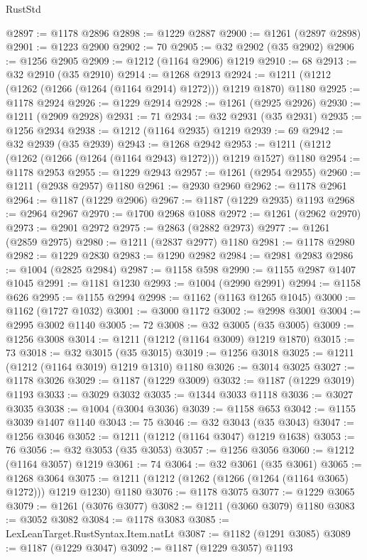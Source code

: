 \begin{lexlean}{RustStd}
\begin{coremodule}
@2897 := @1178 @2896
@2898 := @1229 @2887
@2900 := @1261 (@2897 @2898)
@2901 := @1223 @2900
@2902 := 70
@2905 := @32 @2902 (@35 @2902)
@2906 := @1256 @2905
@2909 := @1212 (@1164 @2906) @1219
@2910 := 68
@2913 := @32 @2910 (@35 @2910)
@2914 := @1268 @2913
@2924 := @1211 (@1212 (@1262 (@1266 (@1264 (@1164 @2914) @1272))) @1219 @1870) @1180
@2925 := @1178 @2924
@2926 := @1229 @2914
@2928 := @1261 (@2925 @2926)
@2930 := @1211 (@2909 @2928)
@2931 := 71
@2934 := @32 @2931 (@35 @2931)
@2935 := @1256 @2934
@2938 := @1212 (@1164 @2935) @1219
@2939 := 69
@2942 := @32 @2939 (@35 @2939)
@2943 := @1268 @2942
@2953 := @1211 (@1212 (@1262 (@1266 (@1264 (@1164 @2943) @1272))) @1219 @1527) @1180
@2954 := @1178 @2953
@2955 := @1229 @2943
@2957 := @1261 (@2954 @2955)
@2960 := @1211 (@2938 @2957) @1180
@2961 := @2930 @2960
@2962 := @1178 @2961
@2964 := @1187 (@1229 @2906)
@2967 := @1187 (@1229 @2935) @1193
@2968 := @2964 @2967
@2970 := @1700 @2968 @1088
@2972 := @1261 (@2962 @2970)
@2973 := @2901 @2972
@2975 := @2863 (@2882 @2973)
@2977 := @1261 (@2859 @2975)
@2980 := @1211 (@2837 @2977) @1180
@2981 := @1178 @2980
@2982 := @1229 @2830
@2983 := @1290 @2982
@2984 := @2981 @2983
@2986 := @1004 (@2825 @2984)
@2987 := @1158 @598
@2990 := @1155 @2987 @1407 @1045
@2991 := @1181 @1230
@2993 := @1004 (@2990 @2991)
@2994 := @1158 @626
@2995 := @1155 @2994
@2998 := @1162 (@1163 @1265 @1045)
@3000 := @1162 (@1727 @1032)
@3001 := @3000 @1172
@3002 := @2998 @3001
@3004 := @2995 @3002 @1140
@3005 := 72
@3008 := @32 @3005 (@35 @3005)
@3009 := @1256 @3008
@3014 := @1211 (@1212 (@1164 @3009) @1219 @1870)
@3015 := 73
@3018 := @32 @3015 (@35 @3015)
@3019 := @1256 @3018
@3025 := @1211 (@1212 (@1164 @3019) @1219 @1310) @1180
@3026 := @3014 @3025
@3027 := @1178 @3026
@3029 := @1187 (@1229 @3009)
@3032 := @1187 (@1229 @3019) @1193
@3033 := @3029 @3032
@3035 := @1344 @3033 @1118
@3036 := @3027 @3035
@3038 := @1004 (@3004 @3036)
@3039 := @1158 @653
@3042 := @1155 @3039 @1407 @1140
@3043 := 75
@3046 := @32 @3043 (@35 @3043)
@3047 := @1256 @3046
@3052 := @1211 (@1212 (@1164 @3047) @1219 @1638)
@3053 := 76
@3056 := @32 @3053 (@35 @3053)
@3057 := @1256 @3056
@3060 := @1212 (@1164 @3057) @1219
@3061 := 74
@3064 := @32 @3061 (@35 @3061)
@3065 := @1268 @3064
@3075 := @1211 (@1212 (@1262 (@1266 (@1264 (@1164 @3065) @1272))) @1219 @1230) @1180
@3076 := @1178 @3075
@3077 := @1229 @3065
@3079 := @1261 (@3076 @3077)
@3082 := @1211 (@3060 @3079) @1180
@3083 := @3052 @3082
@3084 := @1178 @3083
@3085 := LexLeanTarget.RustSyntax.Item.natLt
@3087 := @1182 (@1291 @3085)
@3089 := @1187 (@1229 @3047)
@3092 := @1187 (@1229 @3057) @1193

\end{coremodule}
\end{lexlean}
